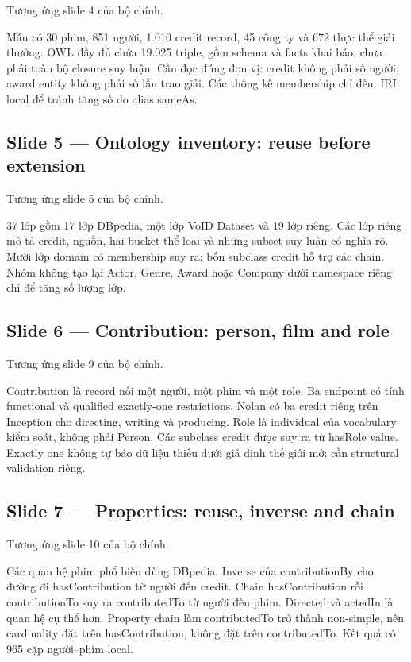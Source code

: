 \documentclass[
  11pt,
]{article}
\begin{document}
Tương ứng slide 4 của bộ chính.

Mẫu có 30 phim, 851 người, 1.010 credit record, 45 công ty và 672 thực
thể giải thưởng. OWL đầy đủ chứa 19.025 triple, gồm schema và facts khai
báo, chưa phải toàn bộ closure suy luận. Cần đọc đúng đơn vị: credit
không phải số người, award entity không phải số lần trao giải. Các thống
kê membership chỉ đếm IRI local để tránh tăng số do alias sameAs.

\subsection{Slide 5 --- Ontology inventory: reuse before
extension}\label{slide-5-ontology-inventory-reuse-before-extension}

Tương ứng slide 5 của bộ chính.

37 lớp gồm 17 lớp DBpedia, một lớp VoID Dataset và 19 lớp riêng. Các lớp
riêng mô tả credit, nguồn, hai bucket thể loại và những subset suy luận
có nghĩa rõ. Mười lớp domain có membership suy ra; bốn subclass credit
hỗ trợ các chain. Nhóm không tạo lại Actor, Genre, Award hoặc Company
dưới namespace riêng chỉ để tăng số lượng lớp.

\subsection{\texorpdfstring{Slide 6 ---
Contribu\allowbreak{}tion:\allowbreak{} person, film and
role}{Slide 6 ---  person, film and role}}\label{slide-6-contribution-person-film-and-role}

Tương ứng slide 9 của bộ chính.

Contribution là record nối một người, một phim và một role. Ba endpoint
có tính functional và qualified exactly-one
restrict\allowbreak{}ions.\allowbreak{} Nolan có ba credit riêng trên
Inception cho directing, writing và producing. Role là individual của
vocabulary kiểm soát, không phải Person. Các subclass credit được suy ra
từ hasRole value. Exactly one không tự báo dữ liệu thiếu dưới giả định
thế giới mở; cần structural validation riêng.

\subsection{Slide 7 --- Properties: reuse, inverse and
chain}\label{slide-7-properties-reuse-inverse-and-chain}

Tương ứng slide 10 của bộ chính.

Các quan hệ phim phổ biến dùng DBpedia. Inverse của
contribu\allowbreak{}tion\allowbreak{}By cho đường đi
has\allowbreak{}Contr\allowbreak{}ibution từ người đến credit. Chain
has\allowbreak{}Contr\allowbreak{}ibution rồi
contribu\allowbreak{}tion\allowbreak{}To suy ra
contribu\allowbreak{}ted\allowbreak{}To từ người đến phim. Directed và
actedIn là quan hệ cụ thể hơn. Property chain làm
contribu\allowbreak{}ted\allowbreak{}To trở thành non-simple, nên
cardinality đặt trên
has\allowbreak{}Contr\allowbreak{}ibution,\allowbreak{} không đặt trên
contribu\allowbreak{}ted\allowbreak{}To.\allowbreak{} Kết quả có 965 cặp
người--phim local.
\end{document}
